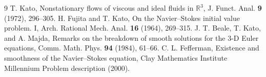 \documentclass[11pt,a4paper]{article}
\begin{document}
\begin{thebibliography}{9}
 T. Kato, Nonstationary flows of viscous and ideal fluids in \(\mathbb{R}^3\), J. Funct. Anal. \textbf{9} (1972), 296--305.
 H. Fujita and T. Kato, On the Navier--Stokes initial value problem. I, Arch. Rational Mech. Anal. \textbf{16} (1964), 269--315.
 J. T. Beale, T. Kato, and A. Majda, Remarks on the breakdown of smooth solutions for the 3-D Euler equations, Comm. Math. Phys. \textbf{94} (1984), 61--66.
 C. L. Fefferman, Existence and smoothness of the Navier--Stokes equation, Clay Mathematics Institute Millennium Problem description (2000).
\end{thebibliography}


\end{document}
